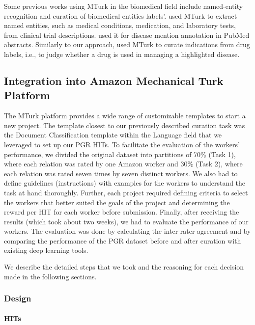 Some previous works using MTurk in the biomedical field include named-entity recognition and curation of biomedical entities labels’. \cite{yetisgen2010preliminary} used MTurk to extract named entities, such as medical conditions, medication, and laboratory tests, from clinical trial descriptions. \cite{good2014microtask} used it for disease mention annotation in PubMed abstracts. Similarly to our approach, \cite{khare2015scaling} used MTurk to curate indications from drug labels, i.e., to judge whether a drug is used in managing a highlighted disease.

\subsection{Integration into Amazon Mechanical Turk Platform}

The MTurk platform provides a wide range of customizable templates to start a new project. The template closest to our previously described curation task was the Document Classification template within the Language field that we leveraged to set up our PGR HITs. To facilitate the evaluation of the workers' performance, we divided the original dataset into partitions of 70\% (Task 1), where each relation was rated by one Amazon worker and 30\% (Task 2), where each relation was rated seven times by seven distinct workers. We also had to define guidelines (instructions) with examples for the workers to understand the task at hand thoroughly. Further, each project required defining criteria to select the workers that better suited the goals of the project and determining the reward per HIT for each worker before submission. Finally, after receiving the results (which took about two weeks), we had to evaluate the performance of our workers. The evaluation was done by calculating the inter-rater agreement and by comparing the performance of the PGR dataset before and after curation with existing deep learning tools.  

We describe the detailed steps that we took and the reasoning for each decision made in the following sections. 

\subsubsection{Design}

\paragraph{HITs}


